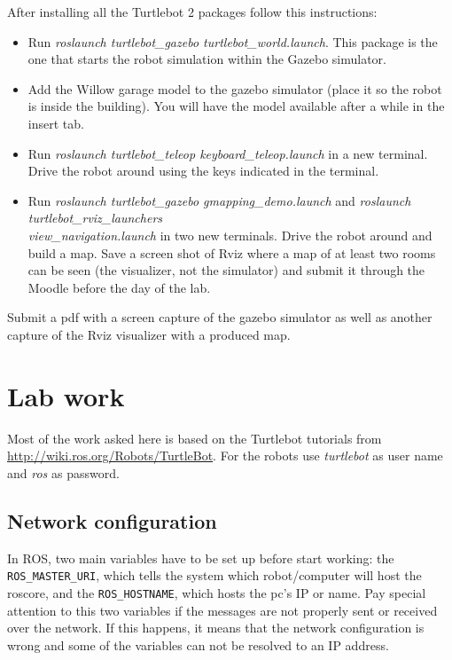 \documentclass[a4paper,10pt]{article}
\begin{document}
After installing all the Turtlebot 2 packages follow this instructions:
\begin{itemize}
	\item Run \textit{roslaunch turtlebot\_gazebo turtlebot\_world.launch}. This package is the one that starts the robot simulation within the Gazebo simulator.
	\item Add the Willow garage model to the gazebo simulator (place it so the robot is inside the building). You will have the model available after a while in the insert tab.
	\item Run \textit{roslaunch turtlebot\_teleop keyboard\_teleop.launch} in a new terminal. Drive the robot around using the keys indicated in the terminal.
	\item Run \textit{roslaunch turtlebot\_gazebo gmapping\_demo.launch} and \textit{roslaunch turtlebot\_rviz\_launchers \\ view\_navigation.launch} in two new terminals. Drive the robot around and build a map. Save a screen shot of Rviz where a map of at least two rooms can be seen (the visualizer, not the simulator) and submit it through the Moodle before the day of the lab.
\end{itemize}
Submit a pdf  with a screen capture of the gazebo simulator as well as another capture of the Rviz visualizer with a produced map.

\section{Lab work}
Most of the work asked here is based on the Turtlebot tutorials from \url{http://wiki.ros.org/Robots/TurtleBot}. For the robots use \textit{turtlebot} as user name and \textit{ros} as password.

\subsection{Network configuration}
In ROS, two main variables have to be set up before start working: the \texttt{ROS\_MASTER\_URI}, which tells the system which robot/computer will host the roscore, and the \texttt{ROS\_HOSTNAME}, which hosts the pc's IP or name. Pay special attention to this two variables if the messages are not properly sent or received over the network. If this happens, it means that the network configuration is wrong and some of the variables can not be resolved to an IP address.
\end{document}
